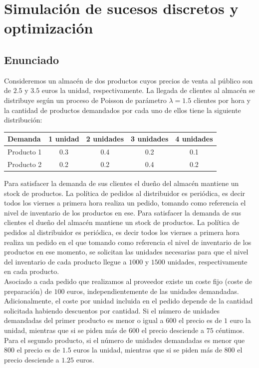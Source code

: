 \documentclass[a4paper,12pt]{article}
\begin{document}
	
	\newpage

	\section{Simulación de sucesos discretos y optimización}

	\subsection{Enunciado}
	Consideremos un almacén de dos productos cuyos precios de venta al público son de $2.5$ y $3.5$ euros la unidad, respectivamente. La llegada de clientes al almacén se distribuye según un proceso de Poisson de parámetro $\lambda = 1.5$ clientes por hora y la cantidad de productos demandados por cada uno de ellos tiene la siguiente distribución:

	\begin{table}[H]
		\centering
		\begin{tabular}{|l||c|c|c|c|}
			\hline
			Demanda    & 1 unidad & 2 unidades & 3 unidades & 4 unidades \\ \hline \hline
			Producto 1 & 0.3      & 0.4        & 0.2        & 0.1        \\ \hline
			Producto 2 & 0.2      & 0.2        & 0.4        & 0.2        \\ \hline
		\end{tabular}
	\end{table}
	
	Para satisfacer la demanda de sus clientes el dueño del almacén mantiene un stock de productos. La política de pedidos al distribuidor es periódica, es decir todos los viernes a primera hora realiza un pedido, tomando como referencia el nivel de inventario de los productos en ese. Para satisfacer la demanda de sus clientes el dueño del almacén mantiene un stock de productos. La política de pedidos al distribuidor es periódica, es decir todos los viernes a primera hora realiza un pedido en el que tomando como referencia el nivel de inventario de los productos en ese momento, se solicitan las unidades necesarias para que el nivel del inventario de cada producto llegue a $1000$ y $1500$ unidades, respectivamente en cada producto.\\

	Asociado a cada pedido que realizamos al proveedor existe un coste fijo (coste de preparación) de $100$ euros, independientemente de las unidades demandadas. Adicionalmente, el coste por unidad incluida en el pedido depende de la cantidad solicitada habiendo descuentos por cantidad. Si el número de unidades demandadas del primer producto es menor o igual a $600$ el precio es de $1$ euro la unidad, mientras que si se piden más de $600$ el precio desciende a $75$ céntimos. Para el segundo producto, si el número de unidades demandadas es menor que $800$ el precio es de $1.5$ euros la unidad, mientras que si se piden más de $800$ el precio desciende a $1.25$ euros.\\
\end{document}
